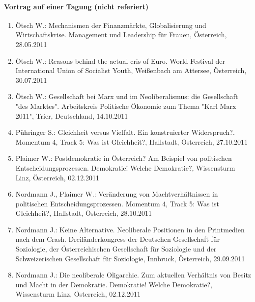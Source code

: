 \paragraph{Vortrag auf einer Tagung (nicht referiert)}
\begin{enumerate}
	\item Ötsch W.: Mechanismen der Finanzmärkte, Globalisierung und Wirtschaftskrise. Management und Leadership für Frauen, Österreich, 28.05.2011
	\item Ötsch W.: Reasons behind the actual cris of Euro. World Festival der International Union of Socialist Youth, Weißenbach am Attersee, Österreich, 30.07.2011
	\item Ötsch W.: Gesellschaft bei Marx und im Neoliberalismus: die Gesellschaft "des Marktes". Arbeitskreis Politische Ökonomie zum Thema "Karl Marx 2011", Trier, Deutschland, 14.10.2011
	\item Pühringer S.: Gleichheit versus Vielfalt. Ein konstruierter Widerspruch?. Momentum 4, Track 5: Was ist Gleichheit?, Hallstadt, Österreich, 27.10.2011
	\item Plaimer W.: Postdemokratie in Österreich? Am Beispiel von politischen Entscheidungsprozessen. Demokratie! Welche Demokratie?, Wissensturm Linz, Österreich, 02.12.2011
	\item Nordmann J., Plaimer W.: Veränderung von Machtverhältnissen in politischen Entscheidungsprozessen. Momentum 4, Track 5: Was ist Gleichheit?, Hallstadt, Österreich, 28.10.2011
	\item Nordmann J.: Keine Alternative. Neoliberale Positionen in den Printmedien nach dem Crash. Dreiländerkongress der Deutschen Gesellschaft für Soziologie, der Österreichischen Gesellschaft für Soziologie und der Schweizerischen Gesellschaft für Soziologie, Innbruck, Österreich, 29.09.2011
	\item Nordmann J.: Die neoliberale Oligarchie. Zum aktuellen Verhältnis von Besitz und Macht in der Demokratie. Demokratie! Welche Demokratie?, Wissensturm Linz, Österreich, 02.12.2011
\end{enumerate}
